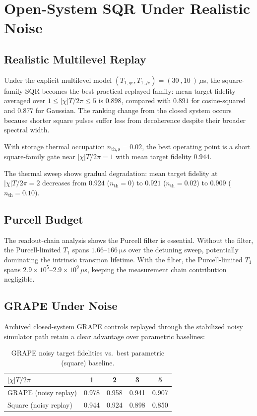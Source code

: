 \documentclass[aps,pra,twocolumn,reprint,amsmath,amssymb]{revtex4-2}
\begin{document}
\section{Open-System SQR Under Realistic Noise}

\subsection{Realistic Multilevel Replay}

Under the explicit multilevel model $(T_{1,ge}, T_{1,fe})=(\SI{30}{}, \SI{10}{})\,\mu$s, the square-family SQR becomes the best practical replayed family: mean target fidelity averaged over $1\le |\chi|T/2\pi\le 5$ is $0.898$, compared with $0.891$ for cosine-squared and $0.877$ for Gaussian. The ranking change from the closed system occurs because shorter square pulses suffer less from decoherence despite their broader spectral width.

With storage thermal occupation $n_\mathrm{th,s}=0.02$, the best operating point is a short square-family gate near $|\chi|T/2\pi=1$ with mean target fidelity $\mathbf{0.944}$.

The thermal sweep shows gradual degradation: mean target fidelity at $|\chi|T/2\pi=2$ decreases from $0.924$ ($n_\mathrm{th}=0$) to $0.921$ ($n_\mathrm{th}=0.02$) to $0.909$ ($n_\mathrm{th}=0.10$).

\subsection{Purcell Budget}

The readout-chain analysis shows the Purcell filter is essential. Without the filter, the Purcell-limited $T_1$ spans $1.66$--$\SI{166}{\micro s}$ over the detuning sweep, potentially dominating the intrinsic transmon lifetime. With the filter, the Purcell-limited $T_1$ spans $2.9\times 10^5$--$2.9\times 10^9\,\mu$s, keeping the measurement chain contribution negligible.

\subsection{GRAPE Under Noise}

Archived closed-system GRAPE controls replayed through the stabilized noisy simulator path retain a clear advantage over parametric baselines:

\begin{table}[tp]
\centering
\caption{GRAPE noisy target fidelities vs.\ best parametric (square) baseline.}
\begin{tabular}{@{} l c c c c @{}}
\toprule
$|\chi|T/2\pi$ & 1 & 2 & 3 & 5 \\
\midrule
GRAPE (noisy replay) & 0.978 & 0.958 & 0.941 & 0.907 \\
Square (noisy replay) & 0.944 & 0.924 & 0.898 & 0.850 \\
\bottomrule
\end{tabular}
\label{tab:grape_vs_parametric}
\end{table}
\end{document}

